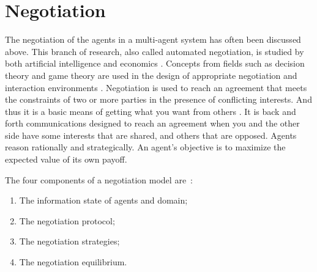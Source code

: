 


\clearpage
\section{Negotiation}
\label{sec:negotiation}
The negotiation of the agents in a multi-agent system has often been discussed above. This branch of research, also called automated negotiation, is studied by both artificial intelligence and economics \citep{jennings2001automated}. Concepts from fields such as decision theory and game theory are used in the design of appropriate negotiation and interaction environments \citep{jennings2001automated}. Negotiation is used to reach an agreement that meets the constraints of two or more parties in the presence of conflicting interests. And thus it is a basic means of getting what you want from others \citep{fisher1987getting}. It is back and forth communications designed to reach an agreement when you and the other side have some interests that are shared, and others that are opposed. Agents reason rationally and strategically. An agent's objective is to maximize the expected value of its own payoff. 

The four components of a negotiation model are~\citep{fatima2004agenda}:
\begin{enumerate}
	\item The information state of agents and domain;
	\item The negotiation protocol;
	\item The negotiation strategies;
	\item The negotiation equilibrium.
\end{enumerate}

